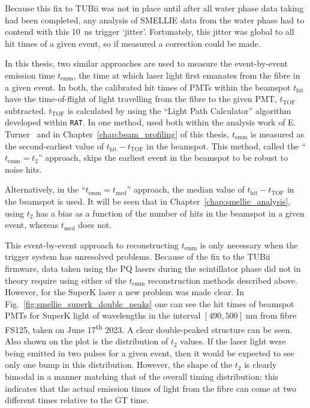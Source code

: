 Because this fix to TUBii was not in place until after all water phase data taking had been completed, any analysis of SMELLIE data from the water phase had to contend with this \SI{10}{\ns} trigger `jitter'. Fortunately, this jitter was global to all hit times of a given event, so if measured a correction could be made.

In this thesis, two similar approaches are used to measure the event-by-event emission time $t_{\mathrm{emm}}$, the time at which laser light first emanates from the fibre in a given event. In both, the calibrated hit times of PMTs within the beamspot $t_{\mathrm{hit}}$ have the time-of-flight of light travelling from the fibre to the given PMT, $t_{\mathrm{TOF}}$ subtracted. $t_{\mathrm{TOF}}$ is calculated by using the ``Light Path Calculator'' algorithm developed within \texttt{RAT}. In one method, used both within the analysis work of E. Turner~\cite{turnerMeasurementScatteringCharacteristics2022} %
and in Chapter~\ref{chap:beam_profiling} of this thesis, $t_{\mathrm{emm}}$ is measured as the second-earliest value of $t_{\mathrm{hit}}-t_{\mathrm{TOF}}$ in the beamspot. This method, called the ``$t_{\mathrm{emm}} = t_{2}$'' approach, skips the earliest event in the beamspot to be robust to noise hits.

Alternatively, in the ``$t_{\mathrm{emm}} = t_{\mathrm{med}}$'' approach, the median value of $t_{\mathrm{hit}}-t_{\mathrm{TOF}}$ in the beamspot is used. It will be seen that in Chapter~\ref{chap:smellie_analysis}, using $t_{2}$ has a bias as a function of the number of hits in the beamspot in a given event, whereas $t_{\mathrm{med}}$ does not.

This event-by-event approach to reconstructing $t_{\mathrm{emm}}$ is only necessary when the trigger system has unresolved problems. Because of the fix to the TUBii firmware, data taken using the PQ lasers during the scintillator phase did not in theory require using either of the $t_{\mathrm{emm}}$ reconstruction methods described above. However, for the SuperK laser a new problem was made clear. In Fig.~\ref{fig:smellie_superk_double_peaks} one can see the hit times of beamspot PMTs for SuperK light of wavelengths in the interval $[490,500]\;\si{\nm}$ from fibre FS125, taken on June 17\textsuperscript{th} 2023. %
A clear double-peaked structure can be seen. Also shown on the plot is the distribution of $t_{2}$ values. If the laser light were being emitted in two pulses for a given event, then it would be expected to see only one bump in this distribution. However, the shape of the $t_{2}$ is clearly bimodal in a manner matching that of the overall timing distribution: this indicates that the actual emission times of light from the fibre can come at two different times relative to the GT time.


